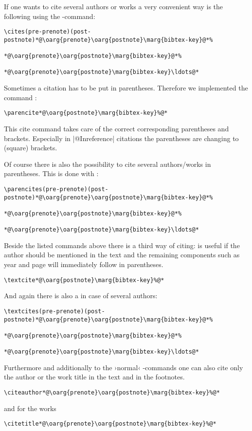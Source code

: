 \documentclass[a4paper,
10pt,
english
]{ltxdoc}
\begin{document}
\DescribeMacro{\cites}
If one wants to cite several authors or works a very convenient way is the following using the -command:
\begin{lstlisting}
\cites(pre-prenote)(post-postnote)*@\oarg{prenote}\oarg{postnote}\marg{bibtex-key}@*%
 																	*@\oarg{prenote}\oarg{postnote}\marg{bibtex-key}@*%
 																	*@\oarg{prenote}\oarg{postnote}\marg{bibtex-key}\ldots@*
\end{lstlisting}
 
\DescribeMacro{\parencite}
Sometimes a citation has to be put in parentheses. 
Therefore we implemented the command :
\begin{lstlisting}
\parencite*@\oarg{postnote}\marg{bibtex-key}%@*
\end{lstlisting} 
This cite command takes care of the correct corresponding parentheses and brackets.
Especially in |@Inreference| citations the parentheses are changing to (square) brackets.


\DescribeMacro{\parencites}
Of course there is also the possibility to cite several authors/works in parentheses.
This is done with :
\begin{lstlisting}
\parencites(pre-prenote)(post-postnote)*@\oarg{prenote}\oarg{postnote}\marg{bibtex-key}@*%
 																			*@\oarg{prenote}\oarg{postnote}\marg{bibtex-key}@*%
 																			*@\oarg{prenote}\oarg{postnote}\marg{bibtex-key}\ldots@*
\end{lstlisting}
 
\DescribeMacro{\textcite}
Beside the listed  commands above there is a third way of citing:
 is useful if the author should be mentioned in the text and
the remaining components such as year and page will immediately follow in parentheses. 
\begin{lstlisting}
\textcite*@\oarg{postnote}\marg{bibtex-key}%@*
\end{lstlisting} 

\DescribeMacro{\textcites}
And again there is also a  in case of several authors: 
  \begin{lstlisting}
\textcites(pre-prenote)(post-postnote)*@\oarg{prenote}\oarg{postnote}\marg{bibtex-key}@*%
 																			*@\oarg{prenote}\oarg{postnote}\marg{bibtex-key}@*%
 																			*@\oarg{prenote}\oarg{postnote}\marg{bibtex-key}\ldots@*
\end{lstlisting}

\DescribeMacro{\citeauthor}\DescribeMacro{\citetitle}\label{citeauthor}%
Furthermore and additionally to the ›normal‹ -commands one can also cite only the author or the work title in the text and in the footnotes.
\begin{lstlisting}
\citeauthor*@\oarg{prenote}\oarg{postnote}\marg{bibtex-key}%@*
\end{lstlisting} 
  and for the works 
\begin{lstlisting}
\citetitle*@\oarg{prenote}\oarg{postnote}\marg{bibtex-key}%@*
\end{lstlisting} 
\end{document}
